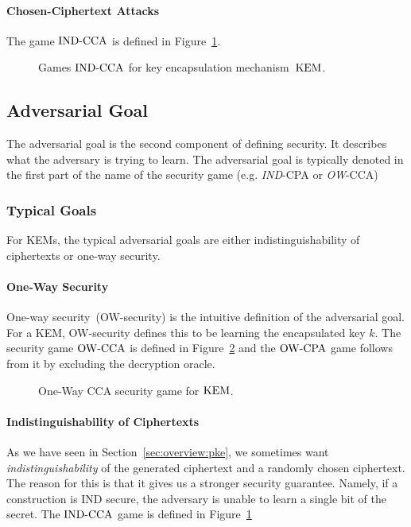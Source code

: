 \paragraph{Chosen-Ciphertext Attacks}
The game ${\mathrm{IND}\text{-}\mathrm{CCA}}$ is defined in Figure~\ref{fig:kem:ind}.

\begin{figure}[!ht]
    \centering
    \nicoresetlinenr%
    \fbox{%
        \scalebox{\codescalefactor}{%
        }%
    }
    \caption{%
        Games ${\mathrm{IND}\text{-}\mathrm{CCA}}$ for key encapsulation mechanism~$\mathrm{KEM}$.
    }
    \label{fig:kem:ind}
\end{figure}

\subsection{Adversarial Goal}
The adversarial goal is the second component of defining security.
It describes what the adversary is trying to learn. 
The adversarial goal is typically denoted in the first part of the name of the security game (e.g. \emph{IND}-CPA or \emph{OW}-CCA)

\subsubsection{Typical Goals}
For KEMs, the typical adversarial goals are either indistinguishability of ciphertexts or one-way security.

\paragraph{One-Way Security}
One-way security~(OW-security) is the intuitive definition of the adversarial goal. 
For a KEM, OW-security defines this to be learning the encapsulated key $k$.
The security game ${\mathrm{OW}\text{-}\mathrm{CCA}}$ is defined in Figure~\ref{fig:kem:ow:cca} and the ${\mathrm{OW}\text{-}\mathrm{CPA}}$ game follows from it by excluding the decryption oracle.

\begin{figure}[!ht]
    \centering
    \nicoresetlinenr%
    \fbox{%
        \scalebox{\codescalefactor}{%
        }%
    }
    \caption{%
        One-Way CCA security game for $\mathrm{KEM}$.
    }
    \label{fig:kem:ow:cca}
\end{figure}

\paragraph{Indistinguishability of Ciphertexts}
As we have seen in Section~\ref{sec:overview:pke}, we sometimes want \emph{indistinguishability} of the generated ciphertext and a randomly chosen ciphertext.
The reason for this is that it gives us a stronger security guarantee. 
Namely, if a construction is IND secure, the adversary is unable to learn a single bit of the secret.
The ${\mathrm{IND}\text{-}\mathrm{CCA}}$ game is defined in Figure~\ref{fig:kem:ind}

